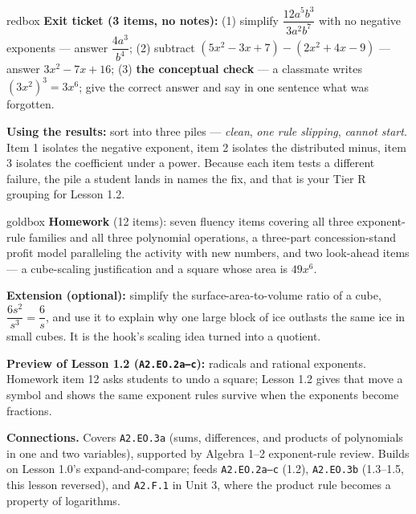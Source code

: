 \documentclass[10pt]{article}
\begin{document}
\begin{skillbox}{redbox}
\textbf{Exit ticket (3 items, no notes):} (1) simplify $\dfrac{12a^5b^3}{3a^2b^7}$ with no negative
exponents --- answer $\dfrac{4a^3}{b^4}$; (2) subtract $\left(5x^2-3x+7\right)-\left(2x^2+4x-9\right)$
--- answer $3x^2-7x+16$; (3) \textbf{the conceptual check} --- a classmate writes
$\left(3x^2\right)^3=3x^6$; give the correct answer and say in one sentence what was forgotten.

\textbf{Using the results:} sort into three piles --- \emph{clean}, \emph{one rule slipping},
\emph{cannot start}. Item 1 isolates the negative exponent, item 2 isolates the distributed minus,
item 3 isolates the coefficient under a power. Because each item tests a different failure, the
pile a student lands in names the fix, and that is your Tier R grouping for Lesson 1.2.
\end{skillbox}

\boxguard[18]
\begin{skillbox}{goldbox}
\textbf{Homework} (12 items): seven fluency items covering all three exponent-rule families and
all three polynomial operations, a three-part concession-stand profit model paralleling the
activity with new numbers, and two look-ahead items --- a cube-scaling justification and a square
whose area is $49x^6$.

\textbf{Extension (optional):} simplify the surface-area-to-volume ratio of a cube, $\dfrac{6s^2}{s^3}
= \dfrac{6}{s}$, and use it to explain why one large block of ice outlasts the same ice in small
cubes. It is the hook's scaling idea turned into a quotient.

\textbf{Preview of Lesson 1.2 (\texttt{A2.EO.2a--c}):} radicals and rational exponents. Homework
item 12 asks students to undo a square; Lesson 1.2 gives that move a symbol and shows the same
exponent rules survive when the exponents become fractions.

\textbf{Connections.} Covers \texttt{A2.EO.3a} (sums, differences, and products of polynomials in
one and two variables), supported by Algebra 1--2 exponent-rule review. Builds on Lesson 1.0's
expand-and-compare; feeds \texttt{A2.EO.2a--c} (1.2), \texttt{A2.EO.3b} (1.3--1.5, this lesson
reversed), and \texttt{A2.F.1} in Unit 3, where the product rule becomes a property of logarithms.
\end{skillbox}
\end{document}
